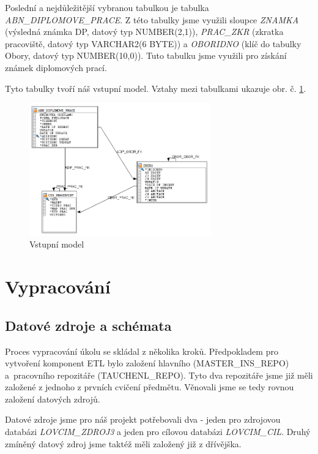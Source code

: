 Poslední a nejdůležitější vybranou tabulkou je tabulka \textit{ABN\_DIPLOMOVE\_PRACE}. 
Z této tabulky jsme využili sloupce \textit{ZNAMKA} (výsledná známka DP, datový typ NUMBER(2,1)),  \textit{PRAC\_ZKR} (zkratka pracoviště, datový typ VARCHAR2(6 BYTE)) a \textit{OBORIDNO} (klíč do tabulky Obory, datový typ NUMBER(10,0)). Tuto tabulku jsme využili pro získání známek diplomových prací. 

Tyto tabulky tvoří náš vstupní model. Vztahy mezi tabulkami ukazuje obr. č. \ref{fig:src-model}. 

\begin{figure}[htb]
    \centering
    \includegraphics[width=0.7\textwidth]{graphs/src-model.png}
    \caption{Vstupní model}
    \label{fig:src-model}
\end{figure}
\FloatBarrier

\section{Vypracování}

\subsection{Datové zdroje a schémata}

Proces vypracování úkolu se skládal z několika kroků.
Předpokladem pro vytvoření komponent ETL bylo založení hlavního (MASTER\_INS\_REPO) a~pracovního repozitáře (TAUCHENL\_REPO).
Tyto dva repozitáře jsme již měli založené z jednoho z prvních cvičení předmětu.
Věnovali jsme se tedy rovnou založení datových zdrojů.

Datové zdroje jsme pro náš projekt potřebovali dva - jeden pro zdrojovou databázi \textit{LOVCIM\_ZDROJ3} a jeden pro cílovou databázi \textit{LOVCIM\_CIL}.
Druhý zmíněný datový zdroj jsme taktéž měli založený již z dřívějška.

